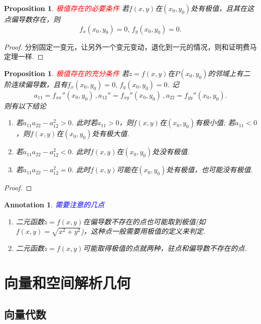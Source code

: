 \documentclass{article}
\newtheorem{proposition}[theorem]{Proposition}
\newtheorem{annotation}[theorem]{Annotation}
\newcommand{\redt}[1]{\textcolor{red}{#1}}
\newcommand{\bluet}[1]{\textcolor{blue}{#1}}
\begin{document}
\begin{proposition}
\rm \redt{极值存在的必要条件} 若$f(x,y)$在$(x_0,y_0)$处有极值，且其在这点偏导数存在，则
$$
f_x(x_0,y_0) = 0, \, f_y(x_0,y_0) = 0.
$$
\end{proposition}

\begin{proof}
分别固定一变元，让另外一个变元变动，退化到一元的情况，则和证明费马定理一样.
\end{proof}

\begin{proposition}
\rm \redt{极值存在的充分条件} 若$z=f(x,y)$在$P(x_0,y_0)$的邻域上有二阶连续偏导数，且有$f_x(x_0,y_0) = 0 ,\,f_y(x_0,y_0) = 0$. 记
$$
a_{11} = f_{xx}''(x_0,y_0)\,, a_{12}'' = f_{xy}''(x_0,y_0)\, , a_{22} = f_{yy}''(x_0,y_0).
$$
则有以下结论
\begin{enumerate}
	\item 若$a_{11}a_{22} - a_{12}^2 > 0$. 此时若$a_{11} > 0$，则$f(x,y)$在$(x_0,y_0)$有极小值; 若$a_{11} < 0$，则$f(x,y)$在$(x_0,y_0)$处有极大值.
	\item 若$a_{11}a_{22} - a_{12}^2 < 0$. 此时$f(x,y)$在$(x_0,y_0)$处没有极值.
	\item 若$a_{11}a_{22} - a_{12}^2 = 0$. 此时$f(x,y)$可能在$(x_0,y_0)$处有极值，也可能没有极值. 
\end{enumerate}
\end{proposition}


\begin{proof}
\rm 
\end{proof}


\begin{annotation}
\rm \bluet{需要注意的几点}
\begin{enumerate}
	\item 二元函数$z=f(x,y)$在偏导数不存在的点也可能取到极值(如$f(x,y)=\sqrt{x^2 + y^2}$)，这种点一般需要用极值的定义来判定.
	\item 二元函数$z=f(x,y)$可能取得极值的点就两种，驻点和偏导数不存在的点.
\end{enumerate} 
\end{annotation}


\newpage
\section{向量和空间解析几何}

\subsection{向量代数}
\end{document}
